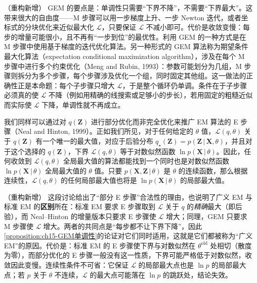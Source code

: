 \documentclass[../../main.tex]{subfiles}
\begin{document}
\begin{remark}（重构新增）
GEM 的要点是：单调性只需要“下界不降”，不需要“下界最大”。这带来很大的自由度——M 步骤可以用一步梯度上升、一步 Newton 迭代，或者坐标式的分块优化来近似最大化 $\mathcal{L}$，只要保证 $\mathcal{L}$ 不减小即可。代价是收敛变慢：每步的增量可能很小，且不再有“一步到位”的最优性。利用 GEM 的一种方式是在 M 步骤中使用基于梯度的迭代优化算法。另一种形式的 GEM 算法称为期望条件最大化算法（expectation conditional maximization algorithm），涉及在每个 M 步骤中进行多个约束优化（Meng and Rubin, 1993）：参数可能划分为几组，M 步骤则拆分为多个步骤，每个步骤涉及优化一个组，同时固定其他组。这一做法的正确性正是本命题：每个子步骤只增大 $\mathcal{L}$，于是整个循环仍单调。条件在于子步骤必须真的使 $\mathcal{L}$ 不降（例如用精确的线搜索或足够小的步长），若用固定的粗糙近似而实际使 $\mathcal{L}$ 下降，单调性就不再成立。
\end{remark}

我们同样可以通过对 $q(\bm{Z})$ 进行部分优化而非完全优化来推广 EM 算法的 E 步骤（Neal and Hinton, 1999）。正如我们所见，对于任何给定的 $\theta$ 值，$\mathcal{L}(q,\theta)$ 关于 $q(\bm{Z})$ 有一个唯一的最大值，对应于后验分布 $q_\star(\bm{Z})=p(\bm{Z}\,|\,\bm{X},\theta)$，并且对于这个选择的 $q(\bm{Z})$，下界 $\mathcal{L}(q,\theta)$ 等于对数似然函数 $\ln p(\bm{X}\,|\,\theta)$。因此，任何收敛到 $\mathcal{L}(q,\theta)$ 全局最大值的算法都能找到一个同时也是对数似然函数 $\ln p(\bm{X}\,|\,\theta)$ 全局最大值的 $\theta$ 值。只要 $p(\bm{X},\bm{Z}\,|\,\theta)$ 是 $\theta$ 的连续函数，那么根据连续性，$\mathcal{L}(q,\theta)$ 的任何局部最大值也将是 $\ln p(\bm{X}\,|\,\theta)$ 的局部最大值。

\begin{remark}（重构新增）
这段讨论给出了“部分 E 步骤”合法性的理由，也说明了广义 EM 与标准 EM 的\textbf{区别}所在：标准 EM 要求 E 步骤取到 $\mathcal{L}$ 关于 $q$ 的\emph{精确}最大（即后验），而 Neal--Hinton 的增量版本只要求 E 步骤使 $\mathcal{L}$ 增大；同理，GEM 只要求 M 步骤使 $\mathcal{L}$ 增大。两者的共同点是“每步都不让下界下降”，因此\cref{proposition:ch15-GEM单调性}的论证对它们同时适用，这就是它们都被称为“广义 EM”的原因。代价是：标准 EM 的 E 步骤使下界与对数似然在 $\theta^{\text{old}}$ 处相切（散度为零），而部分优化的 E 步骤一般没有这一性质，下界可能严格低于对数似然，收敛因此变慢。连续性条件不可省：它保证 $\mathcal{L}$ 的局部最大点也是 $\ln p$ 的局部最大点；若 $p$ 关于 $\theta$ 不连续，$\mathcal{L}$ 的最大点可能落在 $\ln p$ 的跳跃处，结论失效。
\end{remark}
\end{document}
